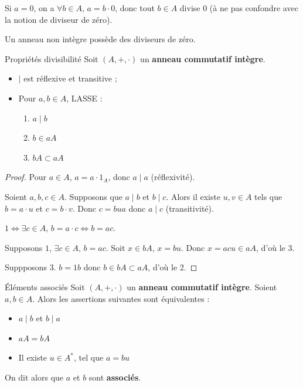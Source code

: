 \begin{remarque}
    Si $a = 0$, on a $\forall b \in A, \, a = b \cdot 0$, donc tout 
    $b \in A$ divise $0$ (à ne pas confondre avec la notion de diviseur de zéro).
\end{remarque}

\begin{remarque}
    Un anneau non intègre possède des diviseurs de zéro.
\end{remarque}

\begin{proposition}{Propriétés divisibilité}{}
    Soit $(A, +, \cdot)$ un \textbf{anneau commutatif intègre}. 

    \begin{itemize}
        \item $\mid$ est réflexive et transitive ;
        \item Pour $a, b \in A$, LASSE : 
        \begin{enumerate}
            \item $a \mid b$ 
            \item $b \in aA$
            \item $bA \subset aA$
        \end{enumerate}
    \end{itemize}
\end{proposition}

\begin{proof}
    Pour $a \in A$, $a = a \cdot 1_A$, donc $a \mid a$ (réflexivité).

    Soient $a, b, c \in A$. Supposons que $a \mid b$ et $b \mid c$.
    Alors il existe $u, v \in A$ tels que $b = a \cdot u$ et $c = b \cdot v$.
    Donc $c = bua$ donc $a \mid c$ (transitivité).

    \avspace $1 \Leftrightarrow \exists c \in A, \, b = a \cdot c \Leftrightarrow b = ac$.

    Supposons $1$, $\exists c \in A, \, b = ac$. Soit $x \in bA$, $x = bu$. Donc $x = acu \in aA$,
    d'où le 3.

    Suppposons 3. $b = 1b$ donc $b \in bA \subset aA$, d'où le 2.
\end{proof}

\begin{theoreme}{Éléments associés}{}
    Soit $(A, +, \cdot)$ un \textbf{anneau commutatif intègre}. 
    Soient $a, b \in A$. Alors les assertions suivantes sont équivalentes : 
    \avspace 
    
    \begin{itemize}
        \item $a \mid b$ et $b \mid a$
        \item $aA = bA$
        \item Il existe $u \in A^*$, tel que $a = bu$
    \end{itemize}

    On dit alors que $a$ et $b$ sont \textbf{associés}.
\end{theoreme}

